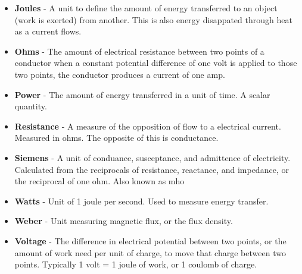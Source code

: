 \documentclass[12pt]{article}
\begin{document}
\begin{itemize}
    \item \textbf{Joules} - A unit to define the amount of energy transferred to an object (work is exerted) from another. This is also energy disappated through heat as a current flows. 

    \item \textbf{Ohms} - The amount of electrical resistance between two points of a conductor when a constant potential difference of one volt is applied to those two points, the conductor produces a current of one amp. 

    \item \textbf{Power} - The amount of energy transferred in a unit of time. A scalar quantity.

    \item \textbf{Resistance} - A measure of the opposition of flow to a electrical current. Measured in ohms. The opposite of this is conductance.

    \item \textbf{Siemens} - A unit of conduance, susceptance, and admittence of electricity. Calculated from the reciprocals of resistance, reactance, and impedance, or the reciprocal of one ohm. Also known as mho

    \item \textbf{Watts} - Unit of 1 joule per second. Used to measure energy transfer.

    \item \textbf{Weber} - Unit measuring magnetic flux, or the flux density. 


    \item \textbf{Voltage} - The difference in electrical potential between two points, or the amount of work need per unit of charge, to move that charge between two points. Typically 1 volt = 1 joule of work, or 1 coulomb of charge. 
\end{itemize}
\end{document}
